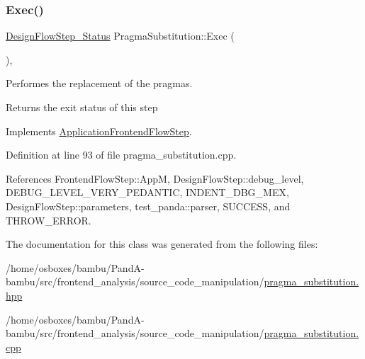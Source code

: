 \mbox{\label{classPragmaSubstitution_a77d4052228752a2ea2a3541f9340bce2}} 
\subsubsection{\texorpdfstring{Exec()}{Exec()}}
{\footnotesize\ttfamily \hyperlink{design__flow__step_8hpp_afb1f0d73069c26076b8d31dbc8ebecdf}{Design\+Flow\+Step\+\_\+\+Status} Pragma\+Substitution\+::\+Exec (\begin{DoxyParamCaption}{ }\end{DoxyParamCaption})\hspace{0.3cm}{\ttfamily [override]}, {\ttfamily [virtual]}}



Performes the replacement of the pragmas. 

\begin{DoxyReturn}{Returns}
the exit status of this step 
\end{DoxyReturn}


Implements \hyperlink{classApplicationFrontendFlowStep_a2bf060a5ebc1735635dc5c7773387a25}{Application\+Frontend\+Flow\+Step}.



Definition at line 93 of file pragma\+\_\+substitution.\+cpp.



References Frontend\+Flow\+Step\+::\+AppM, Design\+Flow\+Step\+::debug\+\_\+level, D\+E\+B\+U\+G\+\_\+\+L\+E\+V\+E\+L\+\_\+\+V\+E\+R\+Y\+\_\+\+P\+E\+D\+A\+N\+T\+IC, I\+N\+D\+E\+N\+T\+\_\+\+D\+B\+G\+\_\+\+M\+EX, Design\+Flow\+Step\+::parameters, test\+\_\+panda\+::parser, S\+U\+C\+C\+E\+SS, and T\+H\+R\+O\+W\+\_\+\+E\+R\+R\+OR.



The documentation for this class was generated from the following files\+:\begin{DoxyCompactItemize}
\item 
/home/osboxes/bambu/\+Pand\+A-\/bambu/src/frontend\+\_\+analysis/source\+\_\+code\+\_\+manipulation/\hyperlink{pragma__substitution_8hpp}{pragma\+\_\+substitution.\+hpp}\item 
/home/osboxes/bambu/\+Pand\+A-\/bambu/src/frontend\+\_\+analysis/source\+\_\+code\+\_\+manipulation/\hyperlink{pragma__substitution_8cpp}{pragma\+\_\+substitution.\+cpp}\end{DoxyCompactItemize}
